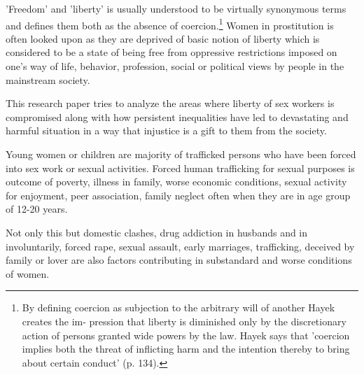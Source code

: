 \begin{multicols}{2}
\noi
'Freedom' and 'liberty' is usually understood to be virtually synonymous terms and defines them
both as the absence of coercion.\footnote{By defining coercion as subjection to the arbitrary will of another Hayek creates the im- pression that liberty is diminished only by the discretionary action of persons granted wide powers by the law. Hayek says that 'coercion
implies both the threat of inflicting harm and the intention thereby to bring about certain conduct' (p. 134).} Women in prostitution is often looked upon as they are
deprived of basic notion of liberty which is considered to be a state of being free from
oppressive restrictions imposed on one's way of life, behavior, profession, social or political
views by people in the mainstream society.

\noi
This research paper tries to analyze the areas where liberty of sex workers is compromised
along with how persistent inequalities have led to devastating and harmful situation in a way
that injustice is a gift to them from the society.


\noi
Young women or children are majority of trafficked persons who have been forced into sex
work or sexual activities. Forced human trafficking for sexual purposes is outcome of poverty,
illness in family, worse economic conditions, sexual activity for enjoyment, peer association,
family neglect often when they are in age group of 12-20 years.

\noi
Not only this but domestic clashes, drug addiction in husbands and in involuntarily, forced
rape, sexual assault, early marriages, trafficking, deceived by family or lover are also factors
contributing in substandard and worse conditions of women.


\end{multicols}
